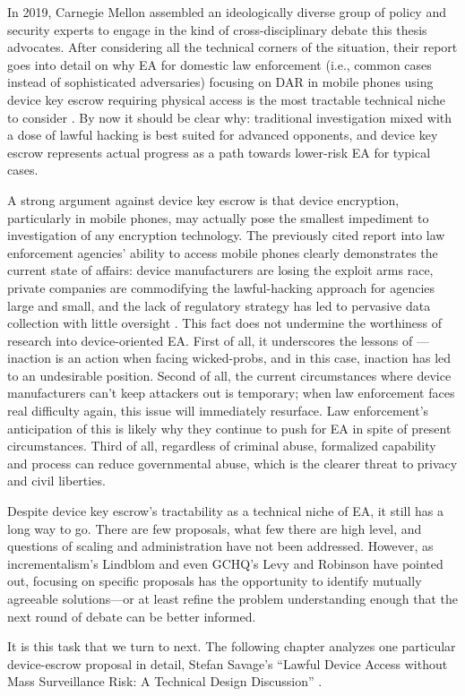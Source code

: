 In 2019, Carnegie Mellon assembled an ideologically diverse group of policy and security experts to engage in the kind
of cross-disciplinary debate this thesis advocates. After considering all the technical corners of the situation, their
report goes into detail on why \ac{EA} for domestic law enforcement (i.e., common cases instead of sophisticated
adversaries) focusing on \ac{DAR} in mobile phones using device key escrow requiring physical access is the most
tractable technical niche to consider \cite{group_2019}. By now it should be clear why: traditional investigation mixed
with a dose of lawful hacking is best suited for advanced opponents, and device key escrow represents actual progress as
a path towards lower-risk \ac{EA} for typical cases.

A strong argument against device key escrow is that device encryption, particularly in mobile phones, may actually pose
the smallest impediment to investigation of any encryption technology. The previously cited report into law enforcement
agencies' ability to access mobile phones clearly demonstrates the current state of affairs: device manufacturers are
losing the exploit arms race, private companies are commodifying the \ac{lawful-hacking} approach for agencies large and
small, and the lack of regulatory strategy has led to pervasive data collection with little oversight
\cite{koepke_2020}. This fact does not undermine the worthiness of research into device-oriented \ac{EA}. First of all,
it underscores the lessons of ---inaction is an action when facing \acp{wicked-prob}, and in this
case, inaction has led to an undesirable position. Second of all, the current circumstances where device manufacturers
can't keep attackers out is temporary; when law enforcement faces real difficulty again, this issue will immediately
resurface. Law enforcement's anticipation of this is likely why they continue to push for \ac{EA} in spite of present
circumstances. Third of all, regardless of criminal abuse, formalized capability and process can reduce governmental
abuse, which is the clearer threat to privacy and civil liberties.

Despite device key escrow's tractability as a technical niche of \ac{EA}, it still has a long way to go. There are few
proposals, what few there are high level, and questions of scaling and administration have not been addressed. However,
as \ac{incrementalism}'s Lindblom and even \ac{GCHQ}'s Levy and Robinson have pointed out, focusing on specific
proposals has the opportunity to identify mutually agreeable solutions---or at least refine the problem understanding
enough that the next round of debate can be better informed.

It is this task that we turn to next. The following chapter analyzes one particular device-escrow proposal in detail,
Stefan Savage's ``Lawful Device Access without Mass Surveillance Risk: A Technical Design Discussion''
\cite{savage_lawful_2018}.
